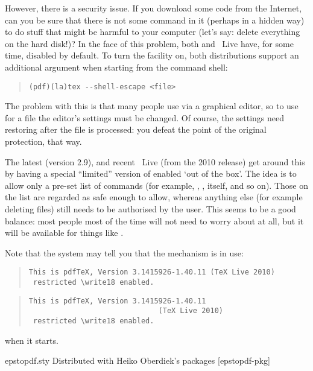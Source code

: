 However, there is a security issue. If you download some \alltex{} code from
the Internet, can you be sure that there is not some command in it
(perhaps in a hidden way) to do stuff that might be harmful to your
computer (let's say: delete everything on the hard disk!)?  In the
face of this problem, both \miktex{} and \tex{}~Live have, for some
time, disabled  by default.  To turn the facility on,
both distributions support an additional argument when starting \tex{}
from the command shell:
\begin{quote}
\begin{verbatim}
(pdf)(la)tex --shell-escape <file>
\end{verbatim}
\end{quote}
The problem with this is that many people use \alltex{} via a graphical
editor, so to use  for a file the editor's settings must
be changed.  Of course, the settings need restoring after the file is
processed: you defeat the point of the original protection, that way.

The latest \miktex{} (version 2.9), and recent \tex{}~Live (from the
2010 release) get
around this by having a special ``limited'' version of 
enabled `out of the box'.  The idea is to allow only a pre-set list of
commands (for example, \BibTeX{}, , \tex{} itself,
and so on).  Those on the list are regarded as safe enough to allow,
whereas anything else (for example deleting files) still needs to be
authorised by the user. This seems to be a good balance: most people
most of the time will not need to worry about  at all,
but it will be available for things like .

Note that the \tex{} system may tell you that the mechanism is in use:
\begin{wideversion}
\begin{quote}
\begin{verbatim}
This is pdfTeX, Version 3.1415926-1.40.11 (TeX Live 2010)
 restricted \write18 enabled.
\end{verbatim}
\end{quote}
\end{wideversion}
\begin{narrowversion}
\begin{quote}
\begin{verbatim}
This is pdfTeX, Version 3.1415926-1.40.11
                              (TeX Live 2010)
 restricted \write18 enabled.
\end{verbatim}
\end{quote}
\end{narrowversion}
when it starts.
\begin{ctanrefs}
\item[epstopdf.sty]Distributed with Heiko Oberdiek's packages
  [epstopdf-pkg]
\end{ctanrefs}

